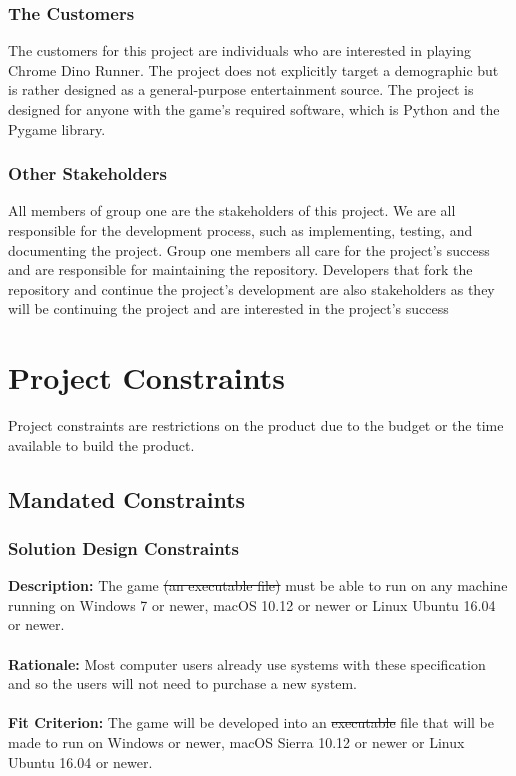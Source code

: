 \documentclass[12pt]{article}
\begin{document}
\subsubsection{The Customers}
The customers for this project are individuals who are interested in playing Chrome Dino Runner. The project does not explicitly target a demographic but is rather designed as a general-purpose entertainment source. The project is designed for anyone with the game's required software, which is Python and the Pygame library. 
\subsubsection{Other Stakeholders}
All members of group one are the stakeholders of this project. We are all responsible for the development process, such as implementing, testing, and documenting the project. Group one members all care for the project's success and are responsible for maintaining the repository. Developers that fork the repository and continue the project's development are also stakeholders as they will be continuing the project and are interested in the project's success


\section{Project Constraints}
Project constraints are restrictions on the product due to the budget or the 
time available to build the product.
\subsection{Mandated Constraints}
\subsubsection{Solution Design Constraints}
\textbf{Description:} The game \sout{(an executable file)} must be able to run on any machine running on Windows 7 or newer, macOS 10.12 or newer or Linux Ubuntu  16.04 or newer.
\\ \\
\textbf{Rationale:} Most computer users already use systems with these specification and so the users will not need to purchase a new system. \\ \\
\textbf{Fit Criterion:} The game will be developed into an \sout{executable} file that will be made to run on Windows or newer, macOS Sierra 10.12 or newer or Linux Ubuntu 16.04 or newer.
\end{document}

